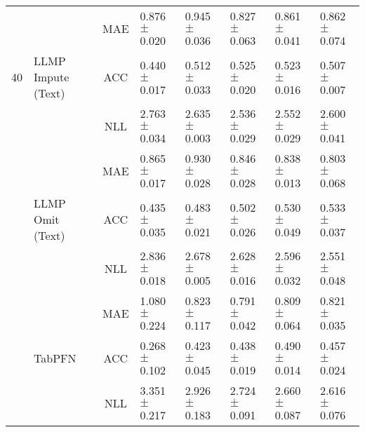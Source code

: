 \begin{table*}[htbp]
\begin{tiny}
\begin{sc}
\begin{adjustbox}{max width=\textwidth}
\begin{tabular}{crclllll}
\cmidrule{2-8}          &       & MAE   & 0.876$\pm$0.020 & 0.945$\pm$0.036 & 0.827$\pm$0.063 & 0.861$\pm$0.041 & 0.862$\pm$0.074 \\
    40    & \multicolumn{1}{l}{LLMP Impute (Text)} & ACC   & 0.440$\pm$0.017 & 0.512$\pm$0.033 & 0.525$\pm$0.020 & 0.523$\pm$0.016 & 0.507$\pm$0.007 \\
          &       & NLL   & 2.763$\pm$0.034 & 2.635$\pm$0.003 & 2.536$\pm$0.029 & 2.552$\pm$0.029 & 2.600$\pm$0.041 \\
\cmidrule{2-8}          &       & MAE   & 0.865$\pm$0.017 & 0.930$\pm$0.028 & 0.846$\pm$0.028 & 0.838$\pm$0.013 & 0.803$\pm$0.068 \\
          & \multicolumn{1}{l}{LLMP Omit (Text)} & ACC   & 0.435$\pm$0.035 & 0.483$\pm$0.021 & 0.502$\pm$0.026 & 0.530$\pm$0.049 & 0.533$\pm$0.037 \\
          &       & NLL   & 2.836$\pm$0.018 & 2.678$\pm$0.005 & 2.628$\pm$0.016 & 2.596$\pm$0.032 & 2.551$\pm$0.048 \\
\cmidrule{2-8}          &       & MAE   & 1.080$\pm$0.224 & 0.823$\pm$0.117 & 0.791$\pm$0.042 & 0.809$\pm$0.064 & 0.821$\pm$0.035 \\
          & \multicolumn{1}{l}{TabPFN} & ACC   & 0.268$\pm$0.102 & 0.423$\pm$0.045 & 0.438$\pm$0.019 & 0.490$\pm$0.014 & 0.457$\pm$0.024 \\
          &       & NLL   & 3.351$\pm$0.217 & 2.926$\pm$0.183 & 2.724$\pm$0.091 & 2.660$\pm$0.087 & 2.616$\pm$0.076 \\
    \bottomrule
    \end{tabular}%
    \end{adjustbox}
  \end{sc}
  \end{tiny}
  \vskip -0.1in
\end{table*}%

